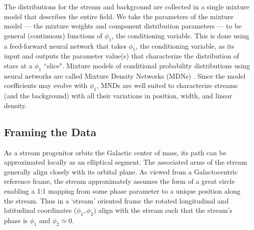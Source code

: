 \documentclass[twocolumn]{aastex631}
\begin{document}
    The distributions for the stream and background are collected in a single
    mixture model that describes the entire field.  We take the parameters of
    the mixture model --- the mixture weights and component distribution
    parameters --- to be general (continuous) functions of $\phi_1$, the
    conditioning variable. This is done using a feed-forward neural network that
    takes $\phi_1$, the conditioning variable, as its input and outputs the
    parameter value(s) that characterize the distribution of stars at a $\phi_1$
    ``slice".  Mixture models of conditional probability distributions using
    neural networks are called Mixture Density Networks (MDNs)
    \citep{Bishop+1994}.  Since the model coefficients may evolve with $\phi_1$,
    MNDs are well suited to characterize streams (and the background) with all
    their variations in position, width, and linear density.



    \subsection{Framing the Data} \label{sub:method:framing_the_data}

        As a stream progenitor orbits the Galactic center of mass, its path can
        be approximated locally as an elliptical segment. The associated arms of
        the stream generally align closely with its orbital plane.  As viewed
        from a Galactocentric reference frame, the stream approximately assumes
        the form of a great circle enabling a 1:1 mapping from some phase
        parameter to a unique position along the stream. Thus in a `stream'
        oriented frame the rotated longitudinal and latitudinal coordinates
        ($\phi_1, \phi_2$) align with the stream such that the stream's phase is
        $\phi_1$ and $\phi_2 \simeq 0$.
\end{document}

